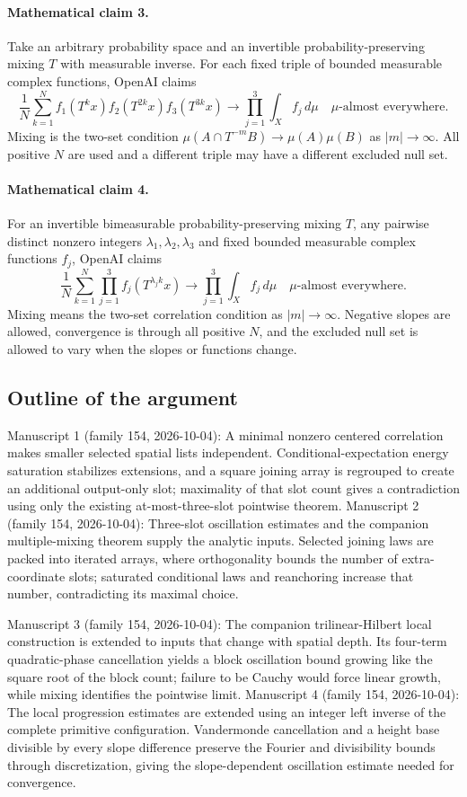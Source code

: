 \documentclass[11pt]{article}
\begin{document}
\paragraph{Mathematical claim 3.} Take an arbitrary probability space and an invertible probability-preserving mixing $T$ with measurable inverse. For each fixed triple of bounded measurable complex functions, OpenAI claims
\[
\frac1N\sum_{k=1}^N f_1(T^kx)f_2(T^{2k}x)f_3(T^{3k}x)
\longrightarrow\prod_{j=1}^3\int_X f_j\,d\mu
\quad\mu\text{-almost everywhere}.
\]
Mixing is the two-set condition $\mu(A\cap T^{-m}B)\to\mu(A)\mu(B)$ as $|m|\to\infty$. All positive $N$ are used and a different triple may have a different excluded null set.

\paragraph{Mathematical claim 4.} For an invertible bimeasurable probability-preserving mixing $T$, any pairwise distinct nonzero integers $\lambda_1,\lambda_2,\lambda_3$ and fixed bounded measurable complex functions $f_j$, OpenAI claims
\[
\frac1N\sum_{k=1}^N\prod_{j=1}^3 f_j(T^{\lambda_j k}x)
\longrightarrow\prod_{j=1}^3\int_X f_j\,d\mu
\quad\mu\text{-almost everywhere}.
\]
Mixing means the two-set correlation condition as $|m|\to\infty$. Negative slopes are allowed, convergence is through all positive $N$, and the excluded null set is allowed to vary when the slopes or functions change.

\subsection{Outline of the argument}
Manuscript 1 (family 154, 2026-10-04): A minimal nonzero centered correlation makes smaller selected spatial lists independent. Conditional-expectation energy saturation stabilizes extensions, and a square joining array is regrouped to create an additional output-only slot; maximality of that slot count gives a contradiction using only the existing at-most-three-slot pointwise theorem. Manuscript 2 (family 154, 2026-10-04): Three-slot oscillation estimates and the companion multiple-mixing theorem supply the analytic inputs. Selected joining laws are packed into iterated arrays, where orthogonality bounds the number of extra-coordinate slots; saturated conditional laws and reanchoring increase that number, contradicting its maximal choice.

Manuscript 3 (family 154, 2026-10-04): The companion trilinear-Hilbert local construction is extended to inputs that change with spatial depth. Its four-term quadratic-phase cancellation yields a block oscillation bound growing like the square root of the block count; failure to be Cauchy would force linear growth, while mixing identifies the pointwise limit. Manuscript 4 (family 154, 2026-10-04): The local progression estimates are extended using an integer left inverse of the complete primitive configuration. Vandermonde cancellation and a height base divisible by every slope difference preserve the Fourier and divisibility bounds through discretization, giving the slope-dependent oscillation estimate needed for convergence.
\end{document}
